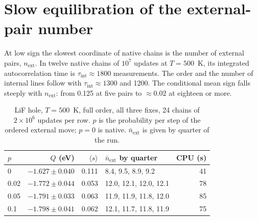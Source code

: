 \documentclass[aps,prb,reprint,superscriptaddress,nofootinbib]{revtex4-2}
\newcommand{\avg}[1]{\langle #1\rangle}
\newcommand{\tauint}{\tau_{\mathrm{int}}}
\begin{document}
\section{Slow equilibration of the external-pair number}
\label{sec:equilibration}

At low sign the slowest coordinate of native chains is the number of external pairs, $n_{\mathrm{ext}}$. In twelve native chains of $10^7$ updates at $T=500$~K, its integrated autocorrelation time is $\tauint\approx1800$ measurements. The order and the number of internal lines follow with $\tauint\approx1300$ and 1200. The conditional mean sign falls steeply with $n_{\mathrm{ext}}$: from 0.125 at five pairs to $\approx0.02$ at eighteen or more.

\begin{table}
\caption{\label{tab:pscan}LiF hole, $T=500$~K, full order, all three fixes, 24 chains of $2\times10^6$ updates per row. $p$ is the probability per step of the ordered external move; $p=0$ is native. $\bar n_{\mathrm{ext}}$ is given by quarter of the run.}
\begin{ruledtabular}
\begin{tabular}{lrrlr}
$p$ & $Q$ (eV) & $\avg{s}$ & $\bar n_{\mathrm{ext}}$ by quarter & CPU (s) \\
\midrule
0 & $-1.627\pm0.040$ & 0.111 & 8.4, 9.5, 8.9, 9.2 & 41 \\
0.02 & $-1.772\pm0.044$ & 0.053 & 12.0, 12.1, 12.0, 12.1 & 78 \\
0.05 & $-1.791\pm0.033$ & 0.063 & 11.9, 11.9, 11.8, 12.0 & 85 \\
0.1 & $-1.798\pm0.041$ & 0.062 & 12.1, 11.7, 11.8, 11.9 & 75 \\
\end{tabular}
\end{ruledtabular}
\end{table}
\end{document}
